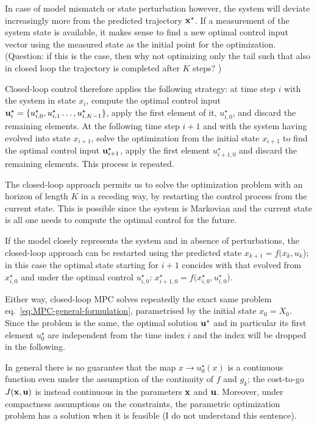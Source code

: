 In case of model mismatch or state perturbation however, the system will deviate increasingly more from the predicted trajectory $\boldsymbol{\mathrm{x}}^\star$. If a measurement of the system state is available, it makes sense to find a new optimal control input vector using the measured state as the initial point for the optimization. (Question: if this is the case, then why not optimizing only the tail such that also in closed loop the trajectory is completed after $K$ steps? )

Closed-loop control therefore applies the following strategy: at time step $i$ with the system in state $x_i$, compute the optimal control input $\boldsymbol{\mathrm{u}}_i^\star=\{u_{i,0}^\star,u_{i,1}^\star\ldots,u_{i,K-1}^\star\}$, apply the first element of it, $u_{i,0}^\star$, and discard the remaining elements. At the following time step $i+1$ and with the system having evolved into state $x_{i+1}$, solve the optimization from the initial state $x_{i+1}$ to find the optimal control input $\boldsymbol{\mathrm{u}}_{i+1}^\star$, apply the first element $u_{i+1,0}^\star$ and discard the remaining elements. This process is repeated.

The closed-loop approach permits us to solve the optimization problem with an horizon of length $K$ in a receding way, by restarting the control process from the current state. This is possible since the system is Markovian and the current state is all one needs to compute the optimal control for the future.

If the model closely represents the system and in absence of perturbations, the closed-loop approach can be restarted using the predicted state $x_{k+1} = f(x_k,u_k$); in this case the optimal state starting for $i+1$ concides with that evolved from $x_{i,0}^\star$ and under the optimal control $u_{i,0}^\star$: $x_{i+1,0}^\star = f(x_{i,0}^\star,u_{i,0}^\star$).

Either way, closed-loop MPC solves repeatedly the exact same problem eq.~\eqref{eq:MPC-general-formulation}, parametrised by the initial state $x_0=X_0$. Since the problem is the same, the optimal solution $\boldsymbol{\mathrm{u}}^\star$ and in particular its first element $u_0^\star$ are independent from the time index $i$ and the index will be dropped in the following.

In general there is no guarantee that the map $x \rightarrow u_0^\star(x)$ is a continuous function even under the assumption of the continuity of $f$ and $g_k$; the cost-to-go $J(\boldsymbol{\mathrm{x}},\boldsymbol{\mathrm{u}})$ is instead continuous in the parameters $\boldsymbol{\mathrm{x}}$ and $\boldsymbol{\mathrm{u}}$. Moreover, under compactness assumptions on the constraints, the parametric optimization problem has a solution when it is feasible (I do not understand this sentence).

